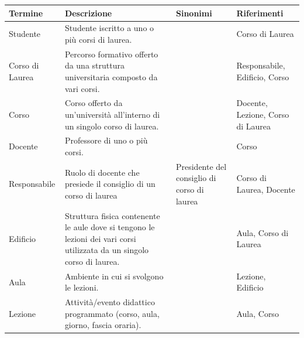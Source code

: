 \documentclass[a4paper,11pt]{article}
\begin{document}
\begin{table}[H]
\centering
\renewcommand{\arraystretch}{1.4}
\begin{tabularx}{\textwidth}{l X X X}
\toprule
\textbf{Termine} & \textbf{Descrizione} & \textbf{Sinonimi} & \textbf{Riferimenti} \\
\midrule
Studente & Studente iscritto a uno o più corsi di laurea. & & Corso di Laurea \\
\addlinespace
Corso di Laurea & Percorso formativo offerto da una struttura universitaria composto da vari corsi. & & Responsabile, Edificio, Corso \\
\addlinespace
Corso & Corso offerto da un'università all'interno di un singolo corso di laurea. & & Docente, Lezione, Corso di Laurea \\
\addlinespace
Docente & Professore di uno o più corsi. & & Corso \\
\addlinespace
Responsabile & Ruolo di docente che presiede il consiglio di un corso di laurea & Presidente del consiglio di corso di laurea & Corso di Laurea, Docente \\
\addlinespace
Edificio & Struttura fisica contenente le aule dove si tengono le lezioni dei vari corsi utilizzata da un singolo corso di laurea. & & Aula, Corso di Laurea \\
\addlinespace
Aula & Ambiente in cui si svolgono le lezioni. & & Lezione, Edificio \\
\addlinespace
Lezione & Attività/evento didattico programmato (corso, aula, giorno, fascia oraria). & & Aula, Corso \\
\bottomrule
\end{tabularx}
\end{table}






\end{document}
